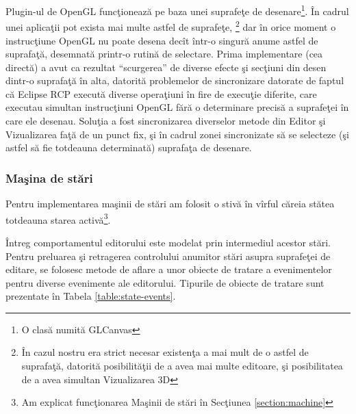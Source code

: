 Plugin-ul de OpenGL funcţionează pe baza unei suprafeţe de desenare\footnote{O 
clasă numită GLCanvas}. În cadrul unei aplicaţii pot exista mai multe astfel de 
suprafeţe, \footnote{În cazul nostru era strict necesar existenţa a mai mult de 
o astfel de suprafaţă, datorită posibilităţii de a avea mai multe editoare, şi 
posibilitatea de a avea simultan Vizualizarea 3D} dar în orice moment o 
instrucţiune OpenGL nu poate desena decît într-o singură anume astfel de 
suprafaţă, desemnată printr-o rutină de selectare. Prima implementare (cea 
directă) a avut ca rezultat ``scurgerea'' de diverse efecte şi secţiuni din 
desen dintr-o suprafaţă în alta, datorită problemelor de sincronizare datorate 
de faptul că Eclipse RCP execută diverse operaţiuni în fire de execuţie 
diferite, care executau simultan instrucţiuni OpenGL fără o determinare precisă 
a suprafeţei în care ele desenau. Soluţia a fost sincronizarea diverselor 
metode din Editor şi Vizualizarea faţă de un punct fix, şi în cadrul zonei 
sincronizate să se selecteze (şi astfel să fie totdeauna determinată) suprafaţa 
de desenare.

\subsubsection{Maşina de stări}
Pentru implementarea maşinii de stări am folosit o stivă în vîrful căreia stătea
totdeauna starea activă\footnote{Am explicat funcţionarea Maşinii de stări în
Secţiunea \ref{section:machine}}.

Întreg comportamentul editorului este modelat prin intermediul acestor stări.
Pentru preluarea şi retragerea controlului anumitor stări asupra suprafeţei de
editare, se folosesc metode de aflare a unor obiecte de tratare a evenimentelor
pentru diverse evenimente ale editorului. Tipurile de obiecte de tratare sunt
prezentate în Tabela \ref{table:state-events}.

